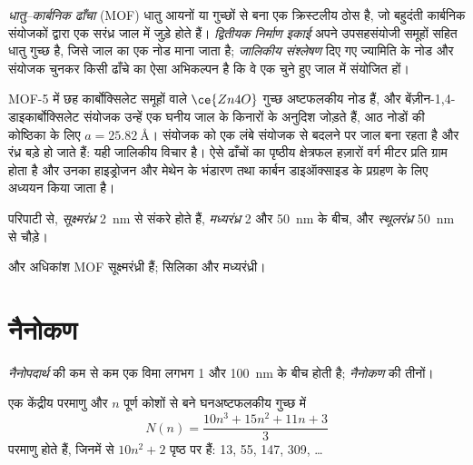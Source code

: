 \begin{definition}[धातु--कार्बनिक ढाँचे]\label{def:b3:inorganic-materials:mof}
\emph{धातु--कार्बनिक ढाँचा} (MOF) धातु आयनों या गुच्छों से बना
एक क्रिस्टलीय ठोस है, जो बहुदंती कार्बनिक संयोजकों द्वारा एक सरंध्र जाल में जुड़े होते हैं।
\emph{द्वितीयक निर्माण
इकाई} अपने उपसहसंयोजी समूहों सहित धातु गुच्छ है,
जिसे जाल का एक नोड माना जाता है; \emph{जालिकीय
संश्लेषण} दिए गए ज्यामिति के नोड और संयोजक चुनकर
किसी ढाँचे का ऐसा अभिकल्पन है कि वे एक चुने हुए जाल में संयोजित हों।
\end{definition}

MOF-5 में छह कार्बोक्सिलेट समूहों वाले $\ce{Zn4O}$ गुच्छ अष्टफलकीय नोड हैं,
और बेंज़ीन-1,4-डाइकार्बोक्सिलेट संयोजक उन्हें एक घनीय जाल के किनारों के अनुदिश
जोड़ते हैं, आठ नोडों की कोष्ठिका के लिए $a = \qty{25.82}{\angstrom}$। संयोजक को एक लंबे
संयोजक से बदलने पर जाल बना रहता है और रंध्र बड़े हो जाते हैं: यही जालिकीय विचार है। ऐसे
ढाँचों का पृष्ठीय क्षेत्रफल हज़ारों वर्ग मीटर प्रति ग्राम होता है और उनका
हाइड्रोजन और मेथेन के भंडारण तथा कार्बन डाइऑक्साइड के प्रग्रहण के लिए अध्ययन किया जाता है।

\begin{definition}[रंध्र आकार]\label{def:b3:inorganic-materials:pores}
परिपाटी से, \emph{सूक्ष्मरंध्र} \qty{2}{nm} से संकरे होते हैं,
\emph{मध्यरंध्र} 2 और \qty{50}{nm} के बीच, और
\emph{स्थूलरंध्र} \qty{50}{nm} से चौड़े।
\end{definition}

 और अधिकांश MOF सूक्ष्मरंध्री हैं; सिलिका  और  मध्यरंध्री।

\section{नैनोकण}

\begin{definition}[नैनोपदार्थ]\label{def:b3:inorganic-materials:nano}
\emph{नैनोपदार्थ} की कम से कम एक विमा लगभग
1 और \qty{100}{nm} के बीच होती है; \emph{नैनोकण} की
तीनों।
\end{definition}

\begin{proposition}[जादुई गुच्छ]\label{prop:b3:inorganic-materials:magic}
एक केंद्रीय परमाणु और $n$ पूर्ण कोशों से बने घनअष्टफलकीय गुच्छ में
\[
  N(n) = \frac{10n^3 + 15n^2 + 11n + 3}{3}
\]
परमाणु होते हैं, जिनमें से $10n^2 + 2$ पृष्ठ पर हैं: 13, 55, 147, 309, \dots
\end{proposition}

